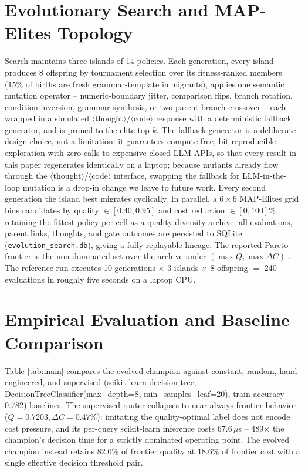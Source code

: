 \documentclass[11pt]{article}
\begin{document}
\section{Evolutionary Search and MAP-Elites Topology}
Search maintains three islands of 14 policies. Each generation, every island produces 8 offspring by tournament selection over its fitness-ranked members (15\% of births are fresh grammar-template immigrants), applies one semantic mutation operator -- numeric-boundary jitter, comparison flips, branch rotation, condition inversion, grammar synthesis, or two-parent branch crossover -- each wrapped in a simulated $\langle$thought$\rangle$/$\langle$code$\rangle$ response with a deterministic fallback generator, and is pruned to the elite top-$k$. The fallback generator is a deliberate design choice, not a limitation: it guarantees compute-free, bit-reproducible exploration with zero calls to expensive closed LLM APIs, so that every result in this paper regenerates identically on a laptop; because mutants already flow through the $\langle$thought$\rangle$/$\langle$code$\rangle$ interface, swapping the fallback for LLM-in-the-loop mutation \cite{elm,funsearch} is a drop-in change we leave to future work. Every second generation the island best migrates cyclically. In parallel, a $6\times6$ MAP-Elites grid \cite{mapelites} bins candidates by quality $\in[0.40,0.95]$ and cost reduction $\in[0,100]\%$, retaining the fittest policy per cell as a quality-diversity archive; all evaluations, parent links, thoughts, and gate outcomes are persisted to SQLite (\texttt{evolution\_search.db}), giving a fully replayable lineage. The reported Pareto frontier is the non-dominated set over the archive under $(\max Q, \max \Delta C)$ \cite{nsgaii}. The reference run executes 10 generations $\times$ 3 islands $\times$ 8 offspring $=$ 240 evaluations in roughly five seconds on a laptop CPU.

\section{Empirical Evaluation and Baseline Comparison}
Table \ref{tab:main} compares the evolved champion against constant, random, hand-engineered, and supervised (scikit-learn decision tree, DecisionTreeClassifier(max\_depth=8, min\_samples\_leaf=20), train accuracy 0.782) baselines. The supervised router collapses to near always-frontier behavior ($Q=0.7203, \Delta C=0.47\%$): imitating the quality-optimal label does not encode cost pressure, and its per-query scikit-learn inference costs 67.6\,$\mu$s -- 489$\times$ the champion's decision time for a strictly dominated operating point. The evolved champion instead retains 82.0\% of frontier quality at 18.6\% of frontier cost with a single effective decision threshold pair.
\end{document}
